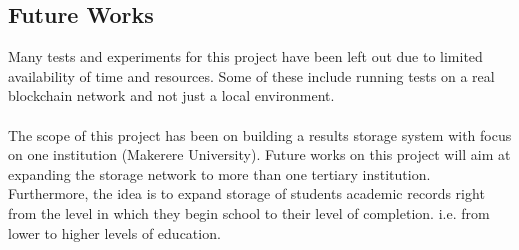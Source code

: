\subsection{Future Works}
Many tests and experiments for this project have been left out due to limited availability of time and resources. Some of these include running tests on a real blockchain network and not just a local environment. \\\\
The scope of this project has been on building a results storage system with focus on one institution (Makerere University). Future works on this project will aim at expanding the storage network to more than one tertiary institution. Furthermore, the idea is to expand storage of students academic records right from the level in which they begin school to their level of completion. i.e. from lower to higher levels of education.